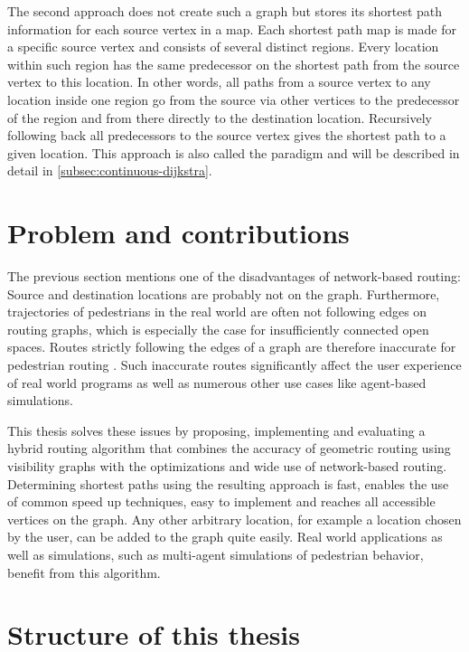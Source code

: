 	The second approach does not create such a graph but stores its shortest path information for each source vertex in a map.
	Each shortest path map is made for a specific source vertex and consists of several distinct regions.
	Every location within such region has the same predecessor on the shortest path from the source vertex to this location.
	In other words, all paths from a source vertex to any location inside one region go from the source via other vertices to the predecessor of the region and from there directly to the destination location.
	Recursively following back all predecessors to the source vertex gives the shortest path to a given location.
	This approach is also called the  paradigm and will be described in detail in \cref{subsec:continuous-dijkstra}.
	
\section{Problem and contributions}

	The previous section mentions one of the disadvantages of network-based routing:
	Source and destination locations are probably not on the graph.
	Furthermore, trajectories of pedestrians in the real world are often not following edges on routing graphs, which is especially the case for insufficiently connected open spaces.
	Routes strictly following the edges of a graph are therefore inaccurate for pedestrian routing \cite{graser-osm-open-spaces}.
	Such inaccurate routes significantly affect the user experience of real world programs as well as numerous other use cases like agent-based simulations.

	This thesis solves these issues by proposing, implementing and evaluating a hybrid routing algorithm that combines the accuracy of geometric routing using visibility graphs with the optimizations and wide use of network-based routing.
	Determining shortest paths using the resulting approach is fast, enables the use of common speed up techniques, easy to implement and reaches all accessible vertices on the graph.
	Any other arbitrary location, for example a location chosen by the user, can be added to the graph quite easily.
	Real world applications as well as simulations, such as multi-agent simulations of pedestrian behavior, benefit from this algorithm.
	
\section{Structure of this thesis}

